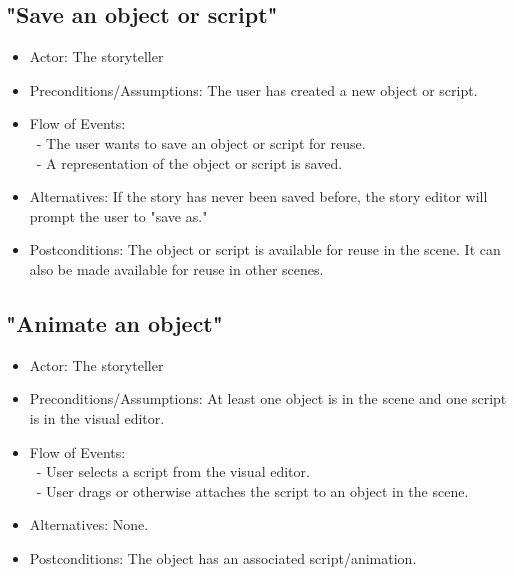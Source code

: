 \documentclass[12pt]{article}
\begin{document}
	\subsection{"Save an object or script"}
\begin{itemize}
	\item Actor: The storyteller
		\item Preconditions/Assumptions: The user has created a new object or script.
	\item Flow of Events: \\
	\	- The user wants to save an object or script for reuse. \\
	\	- A representation of the object or script is saved.
	\item Alternatives: If the story has never been saved before, the story editor will prompt
	the user to "save as."
	\item Postconditions: The object or script is available for reuse in the scene. It can
	also be made available for reuse in other scenes.
\end{itemize}
	
	\subsection{"Animate an object"}
\begin{itemize}
	\item Actor: The storyteller
		\item Preconditions/Assumptions: At least one object is in the scene and one script is in the visual editor.
	\item Flow of Events: \\
	\	- User selects a script from the visual editor. \\
	\	- User drags or otherwise attaches the script to an object in the scene.
	\item Alternatives: None.
	\item Postconditions: The object has an associated script/animation.
\end{itemize}
\end{document}

